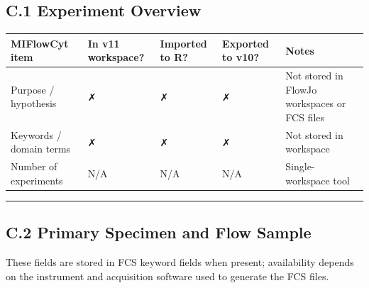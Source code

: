 \documentclass[
]{article}
\begin{document}
\subsection{C.1 Experiment Overview}\label{c.1-experiment-overview}

\begin{longtable}[]{@{}
  >{\raggedright\arraybackslash}p{}
  >{\raggedright\arraybackslash}p{}
  >{\raggedright\arraybackslash}p{}
  >{\raggedright\arraybackslash}p{}
  >{\raggedright\arraybackslash}p{}@{}}
\toprule\noalign{}
\begin{minipage}[b]{\linewidth}\raggedright
MIFlowCyt item
\end{minipage} & \begin{minipage}[b]{\linewidth}\raggedright
In v11 workspace?
\end{minipage} & \begin{minipage}[b]{\linewidth}\raggedright
Imported to R?
\end{minipage} & \begin{minipage}[b]{\linewidth}\raggedright
Exported to v10?
\end{minipage} & \begin{minipage}[b]{\linewidth}\raggedright
Notes
\end{minipage} \\
\midrule\noalign{}
\endhead
\bottomrule\noalign{}
\endlastfoot
Purpose / hypothesis & ✗ & ✗ & ✗ & Not stored in FlowJo workspaces or
FCS files \\
Keywords / domain terms & ✗ & ✗ & ✗ & Not stored in workspace \\
Number of experiments & N/A & N/A & N/A & Single-workspace tool \\
\end{longtable}

\begin{center}\rule{0.5\linewidth}{0.5pt}\end{center}

\subsection{C.2 Primary Specimen and Flow
Sample}\label{c.2-primary-specimen-and-flow-sample}

These fields are stored in FCS keyword fields when present; availability
depends on the instrument and acquisition software used to generate the
FCS files.
\end{document}
